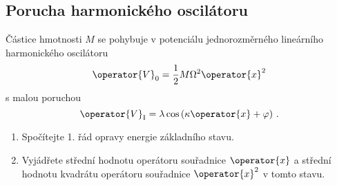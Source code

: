 \subsection{Porucha harmonického oscilátoru}
Částice hmotnosti $M$ se pohybuje v potenciálu jednorozměrného lineárního harmonického oscilátoru
\begin{equation}
    \operator{V}_{0}=\frac{1}{2}M\Omega^{2}\operator{x}^{2}
\end{equation}
s malou poruchou
\begin{equation}
    \operator{V}_{\mathrm{I}}=\lambda\cos\left(\kappa\operator{x}+\varphi\right)\,.
\end{equation}
\begin{enumerate}
\item
    Spočítejte 1. řád opravy energie základního stavu.
    
\item
    Vyjádřete střední hodnotu operátoru souřadnice $\operator{x}$ a střední hodnotu kvadrátu operátoru souřadnice $\operator{x}^{2}$ v tomto stavu.
\end{enumerate}

